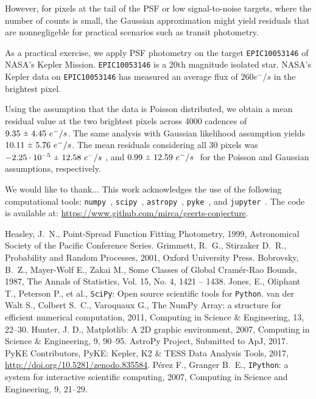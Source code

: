 \documentclass{rnaastex}
\newcommand{\rpm}{\sbox0{$1$}\sbox2{$\scriptstyle\pm$}
\raise\dimexpr(\ht0-\ht2)/2\relax\box2 }
\begin{document}
However, for pixels at the tail of the PSF or low signal-to-noise targets, where the number of counts is small, the Gaussian approximation might yield residuals that are nonnegligeble for practical scenarios such as transit photometry.

As a practical exercise, we apply PSF photometry on the target \texttt{EPIC10053146} of NASA's Kepler Mission. \texttt{EPIC10053146} is a 20th magnitude isolated star. NASA's Kepler data on \texttt{EPIC10053146} has measured an average flux of $260 e^{-}/s$ in the brightest pixel.

Using the assumption that the data is Poisson distributed, we obtain a mean residual value at
the two brightest pixels across 4000 cadences of $9.35~\rpm~4.45~e^{-}/s$. The same analysis
with Gaussian likelihood assumption yields $10.11~\rpm~5.76~e^{-}/s$. The mean residuals
considering all 30 pixels was $-2.25\cdot 10^{-5}~\rpm~12.58~e^{-}/s~$, and $0.99~\rpm~12.59~e^{-}/s~$
for the Poisson and Gaussian assumptions, respectively.

\acknowledgments We would like to thank... This work acknowledges the use of the following computational tools: \texttt{numpy}~\citep{numpy}, \texttt{scipy}~\citep{scipy}, \texttt{astropy}~\citep{astropy}, \texttt{pyke}~\citep{pyke}, and \texttt{jupyter}~\citep{jupyter}.
The code is available at: \url{https://www.github.com/mirca/geerts-conjecture}.

\begin{thebibliography}{}
     Heasley, J.~N., Point-Spread Function Fitting Photometry, 1999, Astronomical Society of the Pacific Conference Series.
     Grimmett, R.~G., Stirzaker D.~R., Probability and Random Processes, 2001, Oxford University Press.
     Bobrovsky, B.~Z., Mayer-Wolf E., Zakai M., Some Classes of Global Cram\'er-Rao Bounds, 1987, The Annals of Statistics, Vol. 15, No. 4, 1421 -- 1438.
     Jones, E., Oliphant T., Peterson P., et al., \texttt{SciPy}: Open source scientific tools for \texttt{Python}.
     van der Walt S., Colbert S.~C., Varoquaux G., The NumPy Array: a structure for efficient numerical computation, 2011, Computing in Science \& Engineering, 13, 22--30.
     Hunter, J. D., Matplotlib: A 2D graphic environment, 2007, Computing in Science \& Engineering, 9, 90--95.
     AstroPy Project, Submitted to ApJ, 2017.
     PyKE Contributors, PyKE: Kepler, K2 \& TESS Data Analysis Tools, 2017, \url{http://doi.org/10.5281/zenodo.835584}.
     P\'erez F., Granger B.~E., \texttt{IPython}: a system for interactive scientific computing, 2007, Computing in Science and Engineering, 9, 21--29.
\end{thebibliography}
\end{document}
